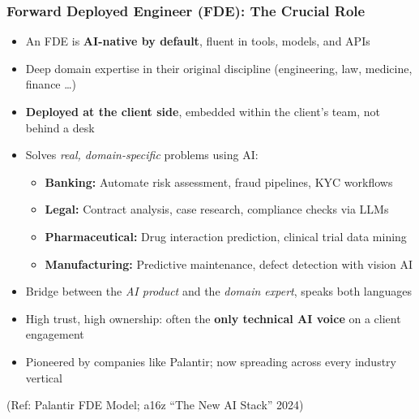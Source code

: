  
\begin{frame}[fragile]\frametitle{Forward Deployed Engineer (FDE): The Crucial Role}
\begin{itemize}
  \item An FDE is \textbf{AI-native by default}, fluent in tools, models, and APIs
  \item Deep domain expertise in their original discipline (engineering, law, medicine, finance \ldots)
  \item \textbf{Deployed at the client side}, embedded within the client's team, not behind a desk
  \item Solves \textit{real, domain-specific} problems using AI:
    \begin{itemize}
      \item \textbf{Banking:} Automate risk assessment, fraud pipelines, KYC workflows
      \item \textbf{Legal:} Contract analysis, case research, compliance checks via LLMs
      \item \textbf{Pharmaceutical:} Drug interaction prediction, clinical trial data mining
      \item \textbf{Manufacturing:} Predictive maintenance, defect detection with vision AI
    \end{itemize}
  \item Bridge between the \textit{AI product} and the \textit{domain expert}, speaks both languages
  \item High trust, high ownership: often the \textbf{only technical AI voice} on a client engagement
  \item Pioneered by companies like Palantir; now spreading across every industry vertical
\end{itemize}
{\tiny (Ref: Palantir FDE Model; a16z ``The New AI Stack'' 2024)}
\end{frame}
 
